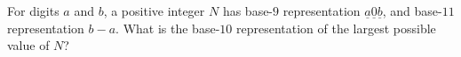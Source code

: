 For digits $a$ and $b$, a positive integer $N$ has base-$9$ representation $\underline{a}\underline{0} \underline{b}$, and base-$11$ representation $b - a$. What is the base-$10$ representation of the largest possible value of $N$?
